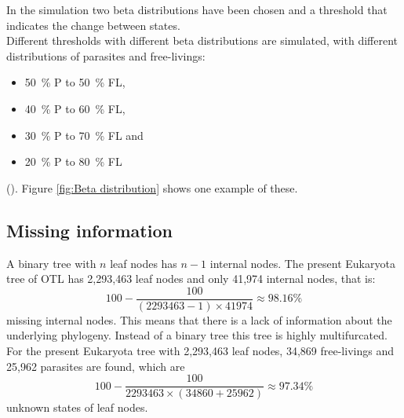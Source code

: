       In the simulation two beta distributions have been chosen and a threshold that indicates the change 
        between states. \\
      Different thresholds with different beta distributions are simulated, with different distributions 
        of parasites and free-livings:
        \begin{itemize}
          \item 50~\% P to 50~\% FL,
          \item 40~\% P to 60~\% FL,
          \item 30~\% P to 70~\% FL and 
          \item 20~\% P to 80~\% FL
        \end{itemize}
        (). Figure \ref{fig:Beta distribution} 
        shows one example of these. \\

    \subsection{Missing information} \label{sec:methods - missing information}

      A binary tree with $n$ leaf nodes has $n-1$ internal nodes. The present Eukaryota tree of OTL has 
        2,293,463 leaf nodes and only 41,974 internal nodes, that is:
      $$100-\frac{100}{(2293463-1) \times 41974} \approx 98.16 \%$$
        missing internal nodes. This means that there is a lack of information about the underlying 
        phylogeny. Instead of a binary tree this tree is highly multifurcated. \\


      For the present Eukaryota tree with 2,293,463 leaf nodes, 34,869 free-livings and 25,962 parasites 
        are found, which are
        $$100-\frac{100}{2293463 \times (34860+25962)} \approx 97.34 \%$$
        unknown states of leaf nodes. \\


